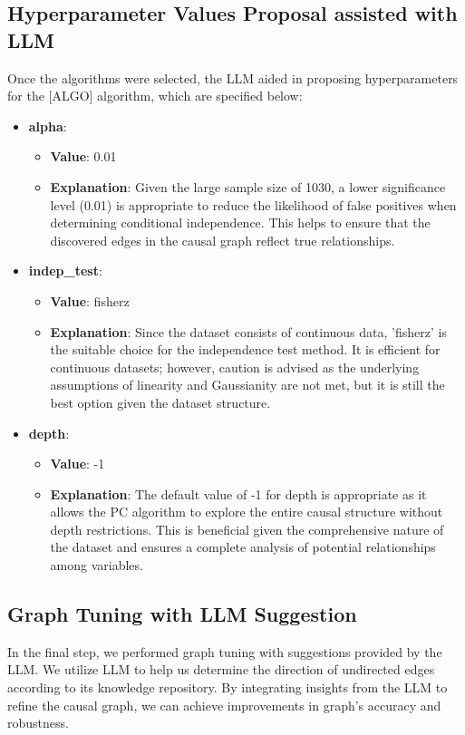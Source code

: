 \documentclass{article}
\begin{document}
\subsection{Hyperparameter Values Proposal assisted with LLM}
Once the algorithms were selected, the LLM aided in proposing hyperparameters 
for the [ALGO] algorithm, which are specified below:
        
\begin{itemize}

\item \textbf{alpha}:
    \begin{itemize}
        \item \textbf{Value}: 0.01
        \item \textbf{Explanation}: Given the large sample size of 1030, a lower significance level (0.01) is appropriate to reduce the likelihood of false positives when determining conditional independence. This helps to ensure that the discovered edges in the causal graph reflect true relationships.
    \end{itemize}

\item \textbf{indep\_test}:
    \begin{itemize}
        \item \textbf{Value}: fisherz
        \item \textbf{Explanation}: Since the dataset consists of continuous data, 'fisherz' is the suitable choice for the independence test method. It is efficient for continuous datasets; however, caution is advised as the underlying assumptions of linearity and Gaussianity are not met, but it is still the best option given the dataset structure.
    \end{itemize}

\item \textbf{depth}:
    \begin{itemize}
        \item \textbf{Value}: -1
        \item \textbf{Explanation}: The default value of -1 for depth is appropriate as it allows the PC algorithm to explore the entire causal structure without depth restrictions. This is beneficial given the comprehensive nature of the dataset and ensures a complete analysis of potential relationships among variables.
    \end{itemize}

\end{itemize}

        
\subsection{Graph Tuning with LLM Suggestion}
In the final step, we performed graph tuning with suggestions provided by the LLM.
We utilize LLM to help us determine the direction of undirected edges according to its knowledge repository.
By integrating insights from the LLM to refine the causal graph, we can achieve improvements in graph's accuracy and robustness.
            
\end{document}
